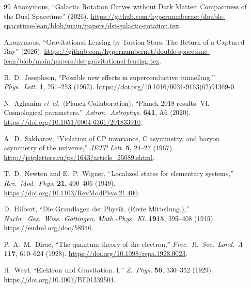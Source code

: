 \documentclass[a4paper]{article}
\begin{document}
\begin{thebibliography}{99}
Anonymous,
``Galactic Rotation Curves without Dark Matter: Compactness of the Dual Spacetime'' (2026).
\url{https://github.com/hypernumbernet/double-spacetime-lean/blob/main/papers/dst-galactic-rotation.tex}.

Anonymous,
``Gravitational Lensing by Torsion Stars: The Return of a Captured Ray'' (2026).
\url{https://github.com/hypernumbernet/double-spacetime-lean/blob/main/papers/dst-gravitational-lensing.tex}.

B.~D.~Josephson,
``Possible new effects in superconductive tunnelling,''
\textit{Phys.\ Lett.} \textbf{1}, 251--253 (1962).
\url{https://doi.org/10.1016/0031-9163(62)91369-0}.

N.~Aghanim \textit{et~al.}\ (Planck Collaboration),
``Planck 2018 results. VI. Cosmological parameters,''
\textit{Astron.\ Astrophys.} \textbf{641}, A6 (2020).
\url{https://doi.org/10.1051/0004-6361/201833910}.

A.~D.~Sakharov,
``Violation of CP invariance, C asymmetry, and baryon asymmetry of the universe,''
\textit{JETP Lett.} \textbf{5}, 24--27 (1967).
\url{http://jetpletters.ru/ps/1643/article_25089.shtml}.

T.~D.~Newton and E.~P.~Wigner,
``Localized states for elementary systems,''
\textit{Rev.\ Mod.\ Phys.} \textbf{21}, 400--406 (1949).
\url{https://doi.org/10.1103/RevModPhys.21.400}.

D.~Hilbert,
``Die Grundlagen der Physik. (Erste Mitteilung.),''
\textit{Nachr.\ Ges.\ Wiss.\ G\"ottingen, Math.-Phys.\ Kl.} \textbf{1915}, 395--408 (1915).
\url{https://eudml.org/doc/58946}.

P.~A.~M.~Dirac,
``The quantum theory of the electron,''
\textit{Proc.\ R.\ Soc.\ Lond.\ A} \textbf{117}, 610--624 (1928).
\url{https://doi.org/10.1098/rspa.1928.0023}.

H.~Weyl,
``Elektron und Gravitation. I,''
\textit{Z.\ Phys.} \textbf{56}, 330--352 (1929).
\url{https://doi.org/10.1007/BF01339504}.

\end{thebibliography}
\end{document}

